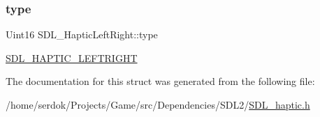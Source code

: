 \subsubsection{\texorpdfstring{type}{type}}
{\footnotesize\ttfamily Uint16 S\+D\+L\+\_\+\+Haptic\+Left\+Right\+::type}

\hyperlink{SDL__haptic_8h_ae047624d8458ff6400887c37a36f86d3}{S\+D\+L\+\_\+\+H\+A\+P\+T\+I\+C\+\_\+\+L\+E\+F\+T\+R\+I\+G\+HT} 

The documentation for this struct was generated from the following file\+:\begin{DoxyCompactItemize}
\item 
/home/serdok/\+Projects/\+Game/src/\+Dependencies/\+S\+D\+L2/\hyperlink{SDL__haptic_8h}{S\+D\+L\+\_\+haptic.\+h}\end{DoxyCompactItemize}
